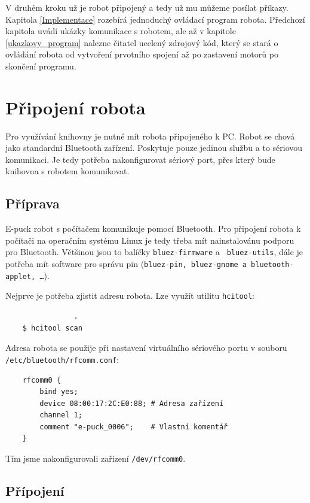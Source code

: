 \documentclass[12pt,notitlepage]{report}
\begin{document}
    V druhém kroku už je robot připojený a tedy už mu můžeme posílat příkazy.
    Kapitola \ref{Implementace} rozebírá jednoduchý ovládací program robota.
    Předchozí kapitola uvádí ukázky komunikace s robotem, ale až v kapitole
    \ref{ukazkovy_program} nalezne čitatel ucelený zdrojový kód, který se stará
    o ovládání robota od vytvoření prvotního spojení až po zastavení motorů po
    skončení programu.

    \section{Připojení robota}
    \label{pripojeni_robota}

    Pro využívání knihovny je nutné mít robota připojeného k PC. Robot se chová
    jako standardní Bluetooth zařízení. Poskytuje pouze jedinou službu a to
    sériovou komunikaci. Je tedy potřeba nakonfigurovat sériový port, přes
    který bude knihovna s robotem komunikovat.

    \subsection{Příprava}

    E-puck robot s počítačem komunikuje pomocí Bluetooth. Pro připojení robota
    k počítači na operačním systému Linux je tedy třeba mít nainstalovánu
    podporu pro Bluetooth. Většinou jsou to balíčky {\tt bluez-firmware} a {\tt
    bluez-utils}, dále je potřeba mít software pro správu pin ({\tt bluez-pin,
    bluez-gnome a bluetooth-applet, \ldots}).

    Nejprve je potřeba zjistit adresu robota. Lze využít utilitu {\tt hcitool}:

    \begin{verbatim}                .
    $ hcitool scan
    \end{verbatim}

    Adresa robota se použije při nastavení virtuálního sériového portu v
    souboru {\tt /etc/bluetooth/rfcomm.conf}:

    \begin{verbatim}
    rfcomm0 {
        bind yes;
        device 08:00:17:2C:E0:88; # Adresa zařízení
        channel 1;
        comment "e-puck_0006";    # Vlastní komentář
    }
    \end{verbatim}

    Tím jsme nakonfigurovali zařízení {\tt /dev/rfcomm0}.

    \subsection{Přípojení}
\end{document}
